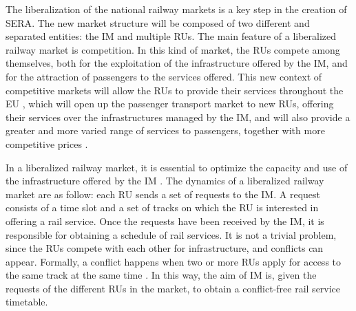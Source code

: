 \documentclass[preprint,12pt]{elsarticle}
\begin{document}
The liberalization of the national railway markets is a key step in the creation of \gls{SERA}. The new market structure will be composed of two different and separated entities: the \gls{IM} and multiple \glspl{RU}. The main feature of a liberalized railway market is competition. In this kind of market, the \glspl{RU} compete among themselves, both for the exploitation of the infrastructure offered by the \gls{IM}, and for the attraction of passengers to the services offered. This new context of competitive markets will allow the \glspl{RU} to provide their services throughout the \gls{EU} \cite{Caramello2017}, which will open up the passenger transport market to new \glspl{RU}, offering their services over the infrastructures managed by the \gls{IM}, and will also provide a greater and more varied range of services to passengers, together with more competitive prices \cite{Caramello2017}.

In a liberalized railway market, it is essential to optimize the capacity and use of the infrastructure offered by the \gls{IM} \cite{Smoliner2018}. The dynamics of a liberalized railway market are as follow: each \gls{RU} sends a set of requests to the \gls{IM}. A request consists of a time slot and a set of tracks on which the \gls{RU} is interested in offering a rail service. Once the requests have been received by the \gls{IM}, it is responsible for obtaining a schedule of rail services. It is not a trivial problem, since the \glspl{RU} compete with each other for infrastructure, and conflicts can appear. Formally, a conflict happens when two or more \glspl{RU} apply for access to the same track at the same time \cite{Schlechte2012}. In this way, the aim of \gls{IM} is, given the requests of the different \glspl{RU} in the market, to obtain a conflict-free rail service timetable. 
\end{document}
